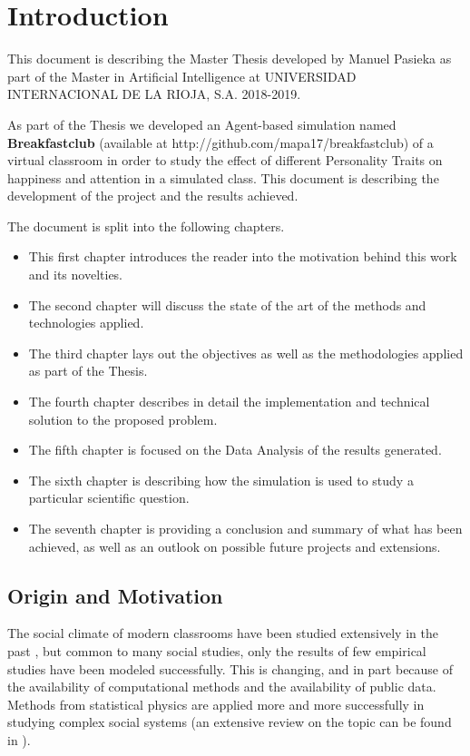 \chapter{Introduction}
This document is describing the Master Thesis developed by Manuel Pasieka as part
of the Master in Artificial Intelligence at UNIVERSIDAD INTERNACIONAL DE LA RIOJA, S.A.
2018-2019. \par

\bb

As part of the Thesis we developed an Agent-based simulation named
\textbf{Breakfastclub} (available at http://github.com/mapa17/breakfastclub) of
a virtual classroom in order to study the effect of different Personality Traits
on happiness and attention in a simulated class. This document is describing the
development of the project and the results achieved.

\bb

The document is split into the following chapters.
\begin{itemize}
\item This first chapter introduces the reader into the motivation behind this work and
its novelties.
\item The second chapter will discuss the state of the art of the methods and technologies
applied.
\item The third chapter lays out the objectives as well as the methodologies applied
as part of the Thesis.
\item The fourth chapter describes in detail the implementation and technical solution
to the proposed problem.
\item The fifth chapter is focused on the Data Analysis of the results generated.
\item The sixth chapter is describing how the simulation is used to study a particular
scientific question.
\item The seventh chapter is providing a conclusion and summary of what has been
achieved, as well as an outlook on possible future projects and extensions.
\end{itemize}

\section{Origin and Motivation}
The social climate of modern classrooms have been studied extensively in the past \cite{Anderson1982},
but common to many social studies, only the results of few empirical studies have been modeled
successfully. This is changing, and in part because of the availability of
computational methods and the availability of public data. Methods from statistical
physics are applied more and more successfully in studying complex social systems
(an extensive review on the topic can be found in \cite{Castellano2007}).

